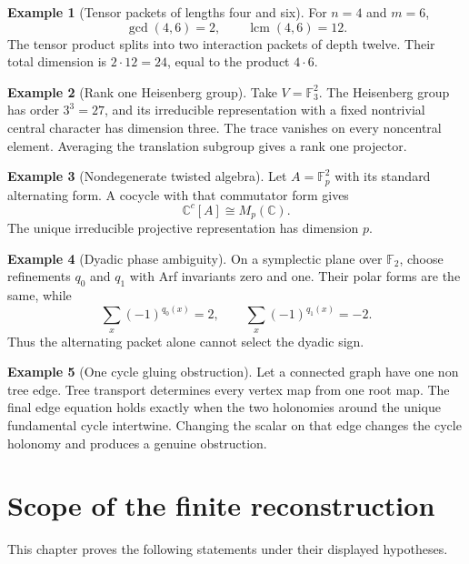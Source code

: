 \documentclass[11pt]{amsart}
\theoremstyle{definition}
\newtheorem{example}[example]{Example}
\theoremstyle{remark}
\newcommand{\CC}{\mathbb C}
\newcommand{\FF}{\mathbb F}
\newcommand{\lcm}{\operatorname{lcm}}
\begin{document}
\begin{example}[Tensor packets of lengths four and six]\label{ex:tensor_46}
For \(n=4\) and \(m=6\),
\[
\gcd(4,6)=2,
\qquad
\lcm(4,6)=12.
\]
The tensor product splits into two interaction packets of depth twelve. Their total dimension is \(2\cdot12=24\), equal to the product \(4\cdot6\).
\end{example}

\begin{example}[Rank one Heisenberg group]\label{ex:heisenberg_rank_one}
Take \(V=\FF_3^2\). The Heisenberg group has order \(3^3=27\), and its irreducible representation with a fixed nontrivial central character has dimension three. The trace vanishes on every noncentral element. Averaging the translation subgroup gives a rank one projector.
\end{example}

\begin{example}[Nondegenerate twisted algebra]\label{ex:twisted_plane}
Let \(A=\FF_p^2\) with its standard alternating form. A cocycle with that commutator form gives
\[
\CC^c[A]\cong M_p(\CC).
\]
The unique irreducible projective representation has dimension \(p\).
\end{example}

\begin{example}[Dyadic phase ambiguity]\label{ex:dyadic_plane}
On a symplectic plane over \(\FF_2\), choose refinements \(q_0\) and \(q_1\) with Arf invariants zero and one. Their polar forms are the same, while
\[
\sum_x(-1)^{q_0(x)}=2,
\qquad
\sum_x(-1)^{q_1(x)}=-2.
\]
Thus the alternating packet alone cannot select the dyadic sign.
\end{example}

\begin{example}[One cycle gluing obstruction]\label{ex:one_cycle}
Let a connected graph have one non tree edge. Tree transport determines every vertex map from one root map. The final edge equation holds exactly when the two holonomies around the unique fundamental cycle intertwine. Changing the scalar on that edge changes the cycle holonomy and produces a genuine obstruction.
\end{example}

\section{Scope of the finite reconstruction}\label{sec:scope}

This chapter proves the following statements under their displayed hypotheses.
\end{document}
